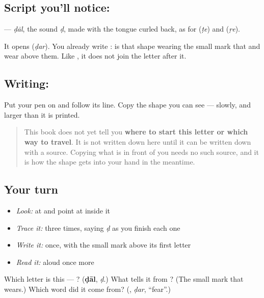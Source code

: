 \subsection*{Script you'll notice: }
\textbf{} — \emph{ḍāl}, the sound \emph{ḍ}, made with the tongue curled back, as for \textbf{} (\emph{ṭe}) and \textbf{} (\emph{ṛe}).

It opens \textbf{} (\emph{ḍar}). You already write \textbf{}: \textbf{} is that shape wearing the small mark that \textbf{} and \textbf{} wear above them. Like \textbf{}, it does not join the letter after it.

\subsection*{Writing: }
Put your pen on  and follow its line. Copy the shape you can see — slowly, and larger than it is printed.

\begin{quote}
This book does not yet tell you \textbf{where to start this letter or which way to travel}. It is not written down here until it can be written down with a source. Copying what is in front of you needs no such source, and it is how the shape gets into your hand in the meantime.
\end{quote}

\subsection*{Your turn}
\begin{itemize}
\raggedright
  \item \emph{Look:} at \textbf{} and point at  inside it
  \item \emph{Trace it:}  three times, saying \emph{ḍ} as you finish each one
  \item \emph{Write it:} \textbf{} once, with the small mark above its first letter
  \item \emph{Read it:} \textbf{} aloud once more
\end{itemize}

\begin{tcolorbox}[breakable,colback=teal!4,colframe=teal!35!black,title={Before you move on}]
Which letter is this — ? (\textbf{ḍāl}, \emph{ḍ}.) What tells it from ? (The small mark that  wears.) Which word did it come from? (\textbf{}, \emph{ḍar}, \textquotedblleft{}fear\textquotedblright{}.)
\end{tcolorbox}
